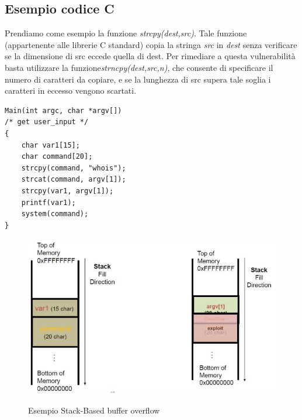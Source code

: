\subsection{Esempio codice C}
Prendiamo come esempio la funzione \textit{strcpy(dest,src)}. Tale funzione (appartenente alle librerie C standard) copia la stringa \textit{src} in \textit{dest} senza verificare se la dimensione di src eccede quella di dest. Per rimediare a questa vulnerabilità basta utilizzare la funzione\textit{strncpy(dest,src,n)}, che consente di specificare il numero di caratteri da copiare, e se la lunghezza di src supera tale soglia i caratteri in eccesso vengono scartati.
\begin{algorithm}
\begin{lstlisting}[caption={Esempio codice vulnerabile al buffer overflow in C}]
Main(int argc, char *argv[])
/* get user_input */
{
	char var1[15];
	char command[20];
	strcpy(command, "whois");
	strcat(command, argv[1]);
	strcpy(var1, argv[1]);
	printf(var1);
	system(command);
}
\end{lstlisting}
\end{algorithm}
\begin{figure}[htbp]
	\centering%
	\subfigure%
	{\includegraphics[height=7cm, width=13cm, keepaspectratio]{Immagini/sistemi_operativi/esempio_stack_2.png}}
	\caption{Esempio Stack-Based buffer overflow\label{fig:esempio_stack}} 	
\end{figure}

